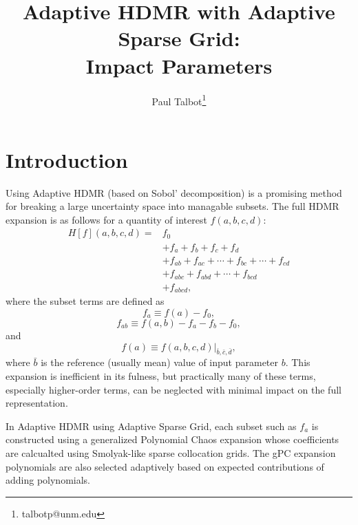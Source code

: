 \documentclass[11pt]{article}
\begin{document}
\title{Adaptive HDMR with Adaptive Sparse Grid:\\Impact Parameters}

\author[]{Paul Talbot\thanks{talbotp@unm.edu}}
\renewcommand\Authands{ and }
\maketitle

\section{Introduction}
Using Adaptive HDMR (based on Sobol' decomposition) is a promising method for breaking a large uncertainty space into managable subsets.  The full HDMR expansion is as follows for a quantity of interest $f(a,b,c,d)$:
\begin{align}
H[f](a,b,c,d) = &f_0 \\
  &+ f_a + f_b + f_c + f_d \\
  &+ f_{ab} + f_{ac}+\cdots + f_{bc} + \cdots + f_{cd} \\
  &+ f_{abc} + f_{abd} + \cdots + f_{bcd} \\
  &+ f_{abcd},
\end{align}
where the subset terms are defined as
\begin{equation}
f_a \equiv f(a) - f_0,
\end{equation}
\begin{equation}
f_{ab} \equiv f(a,b) - f_a - f_b - f_0,
\end{equation}
and
\begin{equation}
f(a) \equiv f(a,b,c,d)\Big|_{\bar b, \bar c, \bar d},
\end{equation}
where $\bar b$ is the reference (usually mean) value of input parameter $b$.
This expansion is inefficient in its fulness, but practically many of these terms, especially higher-order terms, can be neglected with minimal impact on the full representation.

In Adaptive HDMR using Adaptive Sparse Grid, each subset such as $f_a$ is constructed using a generalized Polynomial Chaos expansion whose coefficients are calcualted using Smolyak-like sparse collocation grids.  The gPC expansion polynomials are also selected adaptively based on expected contributions of adding polynomials.
\end{document}
